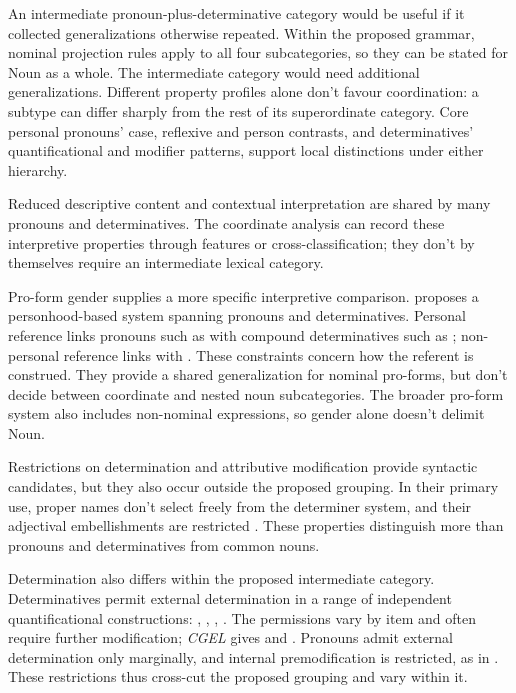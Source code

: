 \documentclass[12pt]{article}
\begin{document}
An intermediate pronoun-plus-determinative category would be useful if it collected generalizations otherwise repeated. Within the proposed grammar, nominal projection rules apply to all four subcategories, so they can be stated for Noun as a whole. The intermediate category would need additional generalizations. Different property profiles alone don't favour coordination: a subtype can differ sharply from the rest of its superordinate category. Core personal pronouns' case, reflexive and person contrasts, and determinatives' quantificational and modifier patterns, support local distinctions under either hierarchy.

Reduced descriptive content and contextual interpretation are shared by many pronouns and determinatives. The coordinate analysis can record these interpretive properties through features or cross-classification; they don't by themselves require an intermediate lexical category.

Pro-form gender supplies a more specific interpretive comparison. \textcite{reynolds2025proformgender} proposes a personhood-based system spanning pronouns and determinatives. Personal reference links pronouns such as  with compound determinatives such as ; non-personal reference links  with . These constraints concern how the referent is construed. They provide a shared generalization for nominal pro-forms, but don't decide between coordinate and nested noun subcategories. The broader pro-form system also includes non-nominal expressions, so gender alone doesn't delimit Noun.

Restrictions on determination and attributive modification provide syntactic candidates, but they also occur outside the proposed grouping. In their primary use, proper names don't select freely from the determiner system, and their adjectival embellishments are restricted \citep[517, 519--520]{huddleston2002}. These properties distinguish more than pronouns and determinatives from common nouns.

Determination also differs within the proposed intermediate category. Determinatives permit external determination in a range of independent quantificational constructions: , , , . The permissions vary by item and often require further modification; \textit{CGEL} gives  and  \citep[415--416]{huddleston2002}. Pronouns admit external determination only marginally, and internal premodification is restricted, as in  \citep[429--430]{huddleston2002}. These restrictions thus cross-cut the proposed grouping and vary within it.
\end{document}
